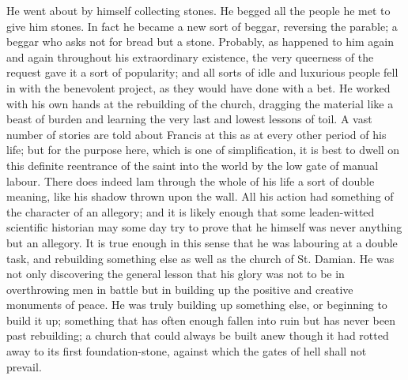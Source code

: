 \documentclass{book}
\begin{document}
He went about by himself collecting stones. He begged all the people he met to give him stones. In fact he became a new sort of beggar, reversing the parable; a beggar who asks not for bread but a stone. Probably, as happened to him again and again throughout his extraordinary existence, the very queerness of the request gave it a sort of popularity; and all sorts of idle and luxurious people fell in with the benevolent project, as they would have done with a bet. He worked with his own hands at the rebuilding of the church, dragging the material like a beast of burden and learning the very last and lowest lessons of toil. A vast number of stories are told about Francis at this as at every other period of his life; but for the purpose here, which is one of simplification, it is best to dwell on this definite reentrance of the saint into the world by the low gate of manual labour. There does indeed lam through the whole of his life a sort of double meaning, like his shadow thrown upon the wall. All his action had something of the character of an allegory; and it is likely enough that some leaden-witted scientific historian may some day try to prove that he himself was never anything but an allegory. It is true enough in this sense that he was labouring at a double task, and rebuilding something else as well as the church of St. Damian. He was not only discovering the general lesson that his glory was not to be in overthrowing men in battle but in building up the positive and creative monuments of peace. He was truly building up something else, or beginning to build it up; something that has often enough fallen into ruin but has never been past rebuilding; a church that could always be built anew though it had rotted away to its first foundation-stone, against which the gates of hell shall not prevail.
\end{document}
